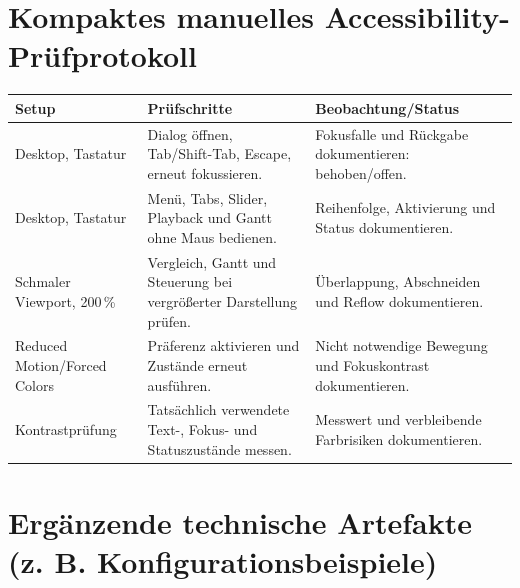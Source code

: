 \section{Kompaktes manuelles Accessibility-Prüfprotokoll}

\begin{tabular}{p{}p{}p{}}
\textbf{Setup} & \textbf{Prüfschritte} & \textbf{Beobachtung/Status} \\
\hline
Desktop, Tastatur & Dialog öffnen, Tab/Shift-Tab, Escape, erneut fokussieren. & Fokusfalle und Rückgabe dokumentieren: behoben/offen. \\
Desktop, Tastatur & Menü, Tabs, Slider, Playback und Gantt ohne Maus bedienen. & Reihenfolge, Aktivierung und Status dokumentieren. \\
Schmaler Viewport, 200\,\% & Vergleich, Gantt und Steuerung bei vergrößerter Darstellung prüfen. & Überlappung, Abschneiden und Reflow dokumentieren. \\
Reduced Motion/Forced Colors & Präferenz aktivieren und Zustände erneut ausführen. & Nicht notwendige Bewegung und Fokuskontrast dokumentieren. \\
Kontrastprüfung & Tatsächlich verwendete Text-, Fokus- und Statuszustände messen. & Messwert und verbleibende Farbrisiken dokumentieren. \\
\end{tabular}

\section{Ergänzende technische Artefakte (z. B. Konfigurationsbeispiele)}
